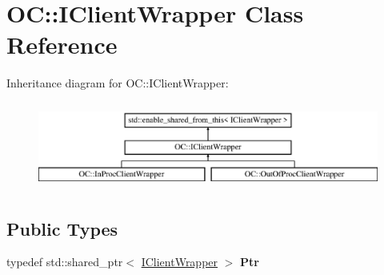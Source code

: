 \hypertarget{classOC_1_1IClientWrapper}{}\section{O\+C\+:\+:I\+Client\+Wrapper Class Reference}
\label{classOC_1_1IClientWrapper}
Inheritance diagram for O\+C\+:\+:I\+Client\+Wrapper\+:\begin{figure}[H]
\begin{center}
\leavevmode
\includegraphics[height=2.876712cm]{classOC_1_1IClientWrapper}
\end{center}
\end{figure}
\subsection*{Public Types}
\begin{DoxyCompactItemize}
\item 
\hypertarget{classOC_1_1IClientWrapper_ae5e1157742c91da0f59e75fc3ae8be45}{}typedef std\+::shared\+\_\+ptr$<$ \hyperlink{classOC_1_1IClientWrapper}{I\+Client\+Wrapper} $>$ {\bfseries Ptr}\label{classOC_1_1IClientWrapper_ae5e1157742c91da0f59e75fc3ae8be45}

\end{DoxyCompactItemize}
